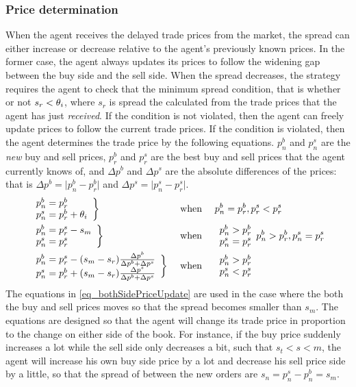 \subsubsection{Price determination}
When the agent receives the delayed trade prices from the market, the spread can either increase or decrease relative to the agent's previously known prices. In the former case, the agent always updates its prices to follow the widening gap between the buy side and the sell side. When the spread decreases, the strategy requires the agent to check that the minimum spread condition, that is whether or not $s_{r} < \theta_{i}$, where $s_{r}$ is spread the calculated from the trade prices that the agent has just \textit{received}. If the condition is not violated, then the agent can freely update prices to follow the current trade prices. If the condition is violated, then the agent determines the trade price by the following equations. $p^b_n$ and $p^s_n$ are the \textit{new} buy and sell prices, $p^b_r$ and $p^s_r$ are the best buy and sell prices that the agent currently knows of, and $\Delta p^b$ and $\Delta p^s$ are the absolute differences of the prices:
 that is $\Delta p^b = \lvert p^b_n - p^b_r \rvert$ and $\Delta p^s = \lvert p^s_n - p^s_r \rvert$.
\begin{align}
& \begin{array}{l}
p^b_n = p^b_r\\
p^s_n = p^b_r + \theta_{i}
\end{array}
\bigg\}
&\text{ when }& &
& p^b_n = p^b_r, p^s_r < p^s_r
\\
& \begin{array}{l}
p^b_n = p^s_r - s_m\\
p^s_n = p^s_r
\end{array}
\bigg\}
&\text{ when }& &
&\begin{array}{l}
p^b_n > p^b_r\\
p^s_n = p^s_r
\end{array}
p^b_n > p^b_r,  p^s_n = p^s_r
\\
& \begin{array}{l}
p^b_n=p^s_r-(s_m-s_r)\frac{\Delta p^b}{\Delta p^b+\Delta p^s}\\
p^s_n=p^b_r+(s_m-s_r)\frac{\Delta p^s}{\Delta p^b+\Delta p^s}
\end{array}
\bigg\}\label{eq_bothSidePriceUpdate}
&\text{ when }& &
&\begin{array}{l}
p^b_n > p^b_r\\
p^s_n < p^s_r
\end{array}
\end{align}
The equations in \ref{eq_bothSidePriceUpdate} are used in the case where the both the buy and sell prices moves so that the spread becomes smaller than $s_m$. The equations are designed so that the agent will change its trade price in proportion to the change on either side of the book. For instance, if the buy price suddenly increases a lot while the sell side only decreases a bit, such that $s_t < s<m$, the agent will increase his own buy side price by a lot and decrease his sell price side by a little, so that the spread of between the new orders are $s_n = p^s_n - p^b_n = s_m$.


